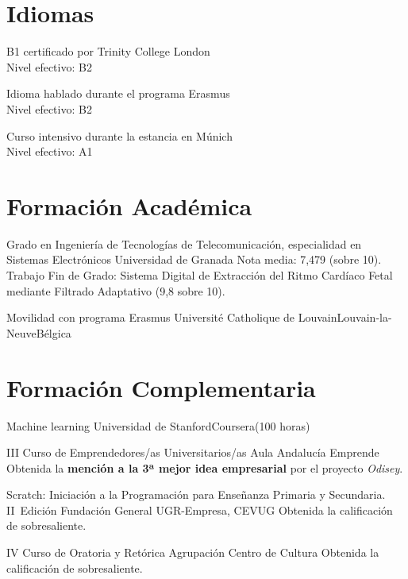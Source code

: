 \documentclass[11pt,a4paper,sans,spanish]{moderncv}
\begin{document}
\section{Idiomas}


{B1 certificado por Trinity College London\\Nivel efectivo: B2}

{Idioma hablado durante el programa Erasmus\\Nivel efectivo: B2}

{Curso intensivo durante la estancia en Múnich\\Nivel efectivo: A1} 


\section{Formación Académica}

{Grado en Ingeniería de Tecnologías de Telecomunicación, especialidad en Sistemas Electrónicos}
{Universidad de Granada}{}{}
{Nota media: 7,479 (sobre 10). 
Trabajo Fin de Grado: 
Sistema Digital de Extracción del Ritmo Cardíaco Fetal mediante Filtrado Adaptativo (9,8 sobre 10).}

{Movilidad con programa Erasmus}
{Université Catholique de Louvain}{Louvain-la-Neuve}{Bélgica}{}


\section{Formación Complementaria}

{Machine learning}
{Universidad de Stanford}{Coursera}{(100 horas)}
{}

{III Curso de Emprendedores/as Universitarios/as}
{Aula Andalucía Emprende}{}{}
{Obtenida la \textbf{mención a la 3ª mejor idea empresarial} por el proyecto \emph{Odisey}. }

{Scratch: Iniciación a la Programación para Enseñanza Primaria y Secundaria. II~Edición}
{Fundación General UGR-Empresa, CEVUG}{}{}
{Obtenida la calificación de sobresaliente.}

{IV Curso de Oratoria y Retórica}
{Agrupación Centro de Cultura}{}{}
{Obtenida la calificación de sobresaliente.}
\end{document}
